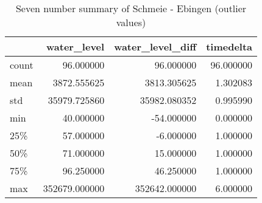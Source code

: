 \begin{table}[htp]
\centering
\caption{Seven number summary of Schmeie - Ebingen (outlier values)}
\label{table:auto-1003803-7-number-summary-outlier}
\begin{tabular}{lrrr}
\toprule
{} &    water\_level &  water\_level\_diff &  timedelta \\
\midrule
count &      96.000000 &         96.000000 &  96.000000 \\
mean  &    3872.555625 &       3813.305625 &   1.302083 \\
std   &   35979.725860 &      35982.080352 &   0.995990 \\
min   &      40.000000 &        -54.000000 &   0.000000 \\
25\%   &      57.000000 &         -6.000000 &   1.000000 \\
50\%   &      71.000000 &         15.000000 &   1.000000 \\
75\%   &      96.250000 &         46.250000 &   1.000000 \\
max   &  352679.000000 &     352642.000000 &   6.000000 \\
\bottomrule
\end{tabular}
\end{table}
